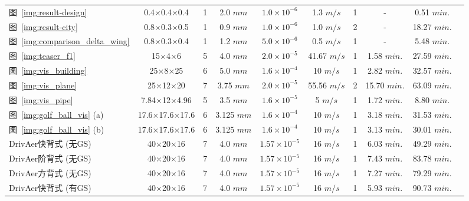 \begin{table}
\begin{center}
{\begin{tabular}{lccccccccc}
				图~\ref{img:result-design}						& 0.4$\times$0.4$\times$0.4		& 1 				& 2.0 $mm$					& $1.0\!\times\!10^{-6}$	& 1.3 $m/s$			& 1					& - 					& 0.51 $min.$			\\
				图~\ref{img:result-city}						& 0.8$\times$0.3$\times$0.5		& 1 				& 0.9 $mm$					& $1.0\!\times\!10^{-6}$	& 1.0 $m/s$			& 2					& - 					& 18.27 $min.$			\\
				图~\ref{img:comparison_delta_wing}				& 0.8$\times$0.3$\times$0.4		& 1 				& 1.2 $mm$					& $5.0\!\times\!10^{-6}$	& 0.5 $m/s$			& 1					& - 					& 5.48 $min.$			\\
				图~\ref{img:teaser_f1}            				& 15$\times$4$\times$6			& 5 				& 4.0 $mm$					& $2.0\!\times\!10^{-5}$	& 41.67 $m/s$		& 1					& 1.58 $min.$			& 27.59 $min.$			\\
				图~\ref{img:vis_building}      					& 25$\times$8$\times$25			& 6 				& 5.0 $mm$					& $1.6\!\times\!10^{-4}$	& 10 $m/s$			& 1					& 2.82 $min.$			& 32.57 $min.$			\\
				图~\ref{img:vis_plane}         					& 25$\times$12$\times$20		& 7 				& 3.75 $mm$					& $2.0\!\times\!10^{-5}$	& 55.56 $m/s$		& 2					& 15.70 $min.$			& 63.09 $min.$			\\
				图~\ref{img:vis_pipe}          					& 7.84$\times$12$\times$4.96	& 5 				& 3.5 $mm$					& $1.6\!\times\!10^{-5}$	& 5 $m/s$			& 1					& 1.72 $min.$			& 8.80 $min.$			\\
				图~\ref{img:golf_ball_vis} (a) 					& 17.6$\times$17.6$\times$17.6	& 6 				& 3.125 $mm$				& $1.6\!\times\!10^{-4}$	& 10 $m/s$			& 1					& 3.18 $min.$			& 31.53 $min.$			\\
				图~\ref{img:golf_ball_vis} (b) 					& 17.6$\times$17.6$\times$17.6	& 6 				& 3.125 $mm$				& $1.6\!\times\!10^{-4}$	& 10 $m/s$			& 1					& 3.13 $min.$			& 30.01 $min.$			\\
				DrivAer快背式 (无GS)        					& 40$\times$20$\times$16		& 7 				& 4.0 $mm$					& $1.57\!\times\!10^{-5}$	& 16 $m/s$			& 1					& 6.03 $min.$			& 49.29 $min.$			\\
				DrivAer阶背式 (无GS)        					& 40$\times$20$\times$16		& 7 				& 4.0 $mm$					& $1.57\!\times\!10^{-5}$	& 16 $m/s$			& 1					& 7.43 $min.$			& 83.78 $min.$			\\
				DrivAer方背式 (无GS)        					& 40$\times$20$\times$16		& 7 				& 4.0 $mm$					& $1.57\!\times\!10^{-5}$	& 16 $m/s$			& 1					& 7.27 $min.$			& 79.29 $min.$			\\
				DrivAer快背式 (有GS)         					& 40$\times$20$\times$16		& 7 				& 4.0 $mm$					& $1.57\!\times\!10^{-5}$	& 16 $m/s$			& 1					& 5.93 $min.$			& 90.73 $min.$			\\

\end{tabular}}
\end{center}
\end{table}

